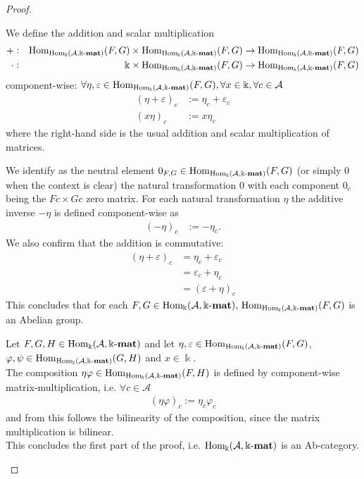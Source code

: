 \begin{proof}
\begin{enumerate}
\begin{subproof}[Proof of (i)]
We define the addition and scalar multiplication
\begin{align*}
+ :&& \mathrm{Hom}_{\mathrm{Hom_{\Bbbk}}(\mathcal{A},\Bbbk\textnormal{-}\mathbf{mat})}(F,G) &\times \mathrm{Hom}_{\mathrm{Hom_{\Bbbk}}(\mathcal{A},\Bbbk\textnormal{-}\mathbf{mat})}(F,G) \rightarrow \mathrm{Hom}_{\mathrm{Hom_{\Bbbk}}(\mathcal{A},\Bbbk\textnormal{-}\mathbf{mat})}(F,G)\\
\cdot :&& \Bbbk &\times \mathrm{Hom}_{\mathrm{Hom_{\Bbbk}}(\mathcal{A},\Bbbk\textnormal{-}\mathbf{mat})}(F,G) \rightarrow \mathrm{Hom}_{\mathrm{Hom_{\Bbbk}}(\mathcal{A},\Bbbk\textnormal{-}\mathbf{mat})}(F,G)
\end{align*}
component-wise: $\forall \eta, \varepsilon \in \mathrm{Hom}_{\mathrm{Hom_{\Bbbk}}(\mathcal{A},\Bbbk\textnormal{-}\mathbf{mat})}(F,G), \forall x \in \Bbbk, \forall c \in \mathcal{A}$
\begin{align}
(\eta+\varepsilon)_{c} &:= \eta_{c} + \varepsilon_{c}\\
(x \eta)_{c} &:= x\eta_{c}
\end{align}
where the right-hand side is the usual addition and scalar multiplication of matrices.

We identify as the neutral element $0_{F,G} \in \mathrm{Hom}_{\mathrm{Hom_{\Bbbk}}(\mathcal{A},\Bbbk\textnormal{-}\mathbf{mat})}(F,G)$ (or simply $0$ when the context is clear)
the natural transformation $0$ with each component $0_{c}$ being the $Fc\times Gc$ zero matrix.
For each natural transformation $\eta$ the additive inverse $-\eta$ is defined component-wise as
\begin{align}
(-\eta)_{c} &:= -\eta_{c}.
\end{align}
We also confirm that the addition is commutative:
\begin{align}
(\eta+\varepsilon)_{c} &= \eta_{c} + \varepsilon_{c}\\
    &= \varepsilon_{c} + \eta_{c}\\
    &= (\varepsilon + \eta)_{c}
\end{align}
This concludes that for each $F, G \in \mathrm{Hom_{\Bbbk}}(\mathcal{A},\Bbbk\textnormal{-}\mathbf{mat}),\, \mathrm{Hom}_{\mathrm{Hom_{\Bbbk}}(\mathcal{A},\Bbbk\textnormal{-}\mathbf{mat})}(F,G)$ is an Abelian group.
\end{subproof}
\begin{subproof}[Proof of (ii)]
Let $F, G, H \in \mathrm{Hom_{\Bbbk}}(\mathcal{A},\Bbbk\textnormal{-}\mathbf{mat})$ and let $\eta, \varepsilon \in \mathrm{Hom}_{\mathrm{Hom_{\Bbbk}}(\mathcal{A},\Bbbk\textnormal{-}\mathbf{mat})}(F,G)$,
$\varphi, \psi \in \mathrm{Hom}_{\mathrm{Hom_{\Bbbk}}(\mathcal{A},\Bbbk\textnormal{-}\mathbf{mat})}(G,H)$ and $x \in \Bbbk$.\\
The composition $\eta\varphi \in \mathrm{Hom}_{\mathrm{Hom_{\Bbbk}}(\mathcal{A},\Bbbk\textnormal{-}\mathbf{mat})}(F,H)$ is defined by component-wise matrix-multiplication,
i.e. $\forall c \in \mathcal{A}$
\begin{align*}
(\eta\varphi)_{c} := \eta_{c}\varphi_{c}
\end{align*}
and from this follows the bilinearity of the composition, since the matrix multiplication is bilinear.\\
This concludes the first part of the proof, i.e. $\mathrm{Hom_{\Bbbk}}(\mathcal{A},\Bbbk\textnormal{-}\mathbf{mat})$ is an Ab-category.
\end{subproof}


\end{enumerate}
\end{proof}
